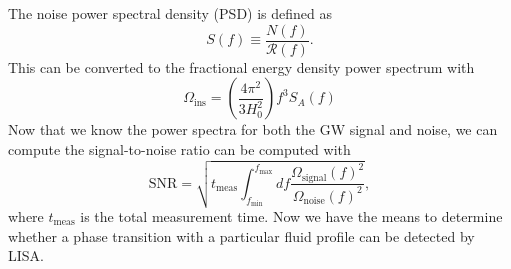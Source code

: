 The noise power spectral density (PSD) is defined as
\cite[eq. 3.1]{gowling_lisa_2021}
\begin{equation}
S(f) \equiv \frac{N(f)}{\mathcal{R}(f)}.
\end{equation}
This can be converted to the fractional energy density power spectrum with
\cites[eq. 3.8]{gowling_lisa_2021}[eq. 59]{smith_lisa_2019}
\begin{equation}
\Omega_\text{ins} = \left( \frac{4 \pi^2}{3 H_0^2} \right) f^3 S_A(f)
\end{equation}
Now that we know the power spectra for both the GW signal and noise, we can compute the signal-to-noise ratio can be computed with
\cites[eq. 50]{smith_lisa_2019}[eq. 33]{caprini_detecting_2020}
\begin{equation}
\text{SNR} = \sqrt{t_\text{meas} \int_{f_\text{min}}^{f_\text{max}} df \frac{\Omega_\text{signal}(f)^2}{\Omega_\text{noise}(f)^2}},
\end{equation}
where $t_\text{meas}$ is the total measurement time.
Now we have the means to determine whether a phase transition with a particular fluid profile can be detected by LISA.
